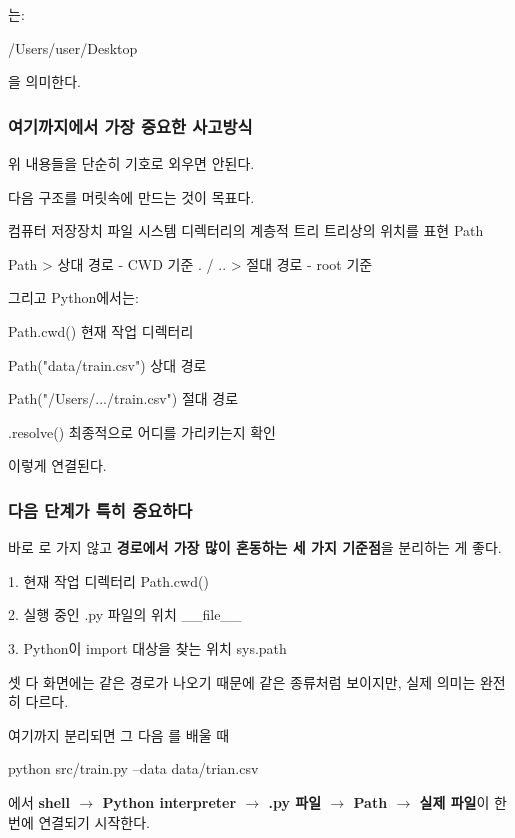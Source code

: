 는:

\begin{dhkzsh}
/Users/user/Desktop
\end{dhkzsh}

을 의미한다.

\subsubsection{여기까지에서 가장 중요한 사고방식}

위 내용들을 단순히 기호로 외우면 안된다.

다음 구조를 머릿속에 만드는 것이 목표다.

\begin{dhksmry}[centered]
컴퓨터 저장장치
\da
파일 시스템
\da
디렉터리의 계층적 트리
\da
트리상의 위치를 표현
\da
Path
\end{dhksmry}

\begin{dhkdir}
Path
> 상대 경로 - CWD 기준 . / ..
> 절대 경로 - root 기준
\end{dhkdir}

그리고 Python에서는:

\begin{dhksmry}[centered]
Path.cwd()
\da
현재 작업 디렉터리

Path("data/train.csv")
\da
상대 경로

Path("/Users/.../train.csv")
\da
절대 경로

.resolve()
\da
최종적으로 어디를 가리키는지 확인
\end{dhksmry}

이렇게 연결된다.

\subsubsection{다음 단계가 특히 중요하다}

바로 로 가지 않고 \textbf{경로에서 가장 많이 혼동하는 세 가지 기준점}을 분리하는 게 좋다.

\begin{dhknote}
\begin{dhksmry}
1. 현재 작업 디렉터리 \ra Path.cwd()

2. 실행 중인 .py 파일의 위치 \ra __file__

3. Python이 import 대상을 찾는 위치 \ra sys.path
\end{dhksmry}
\end{dhknote}

셋 다 화면에는  같은 경로가 나오기 때문에 같은 종류처럼 보이지만, 실제 의미는 완전히 다르다.

여기까지 분리되면 그 다음 를 배울 때

\begin{dhkzsh}
python src/train.py --data data/trian.csv
\end{dhkzsh}

에서 \textbf{shell $\rightarrow$ Python interpreter $\rightarrow$ .py 파일 $\rightarrow$ Path $\rightarrow$ 실제 파일}이 한번에 연결되기 시작한다.



